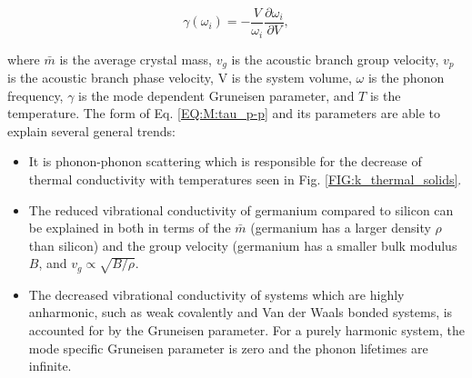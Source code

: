 \documentclass[letterpaper,12pt]{article}
\begin{document}
\begin{equation}\label{EQ:M:tau_p-p}
\gamma(\omega_i) = - \frac{V}{\omega_i}\frac{\partial\omega_i}{\partial V} ,
\end{equation}

where $\bar m$ is the average crystal mass, $v_g$ is the acoustic branch group velocity, $v_p$ is the acoustic branch phase velocity, V is the system volume, $\omega$ is the phonon frequency, $\gamma$ is the mode dependent Gruneisen parameter, and $T$ is the temperature.\cite{callaway1959,holland1963} 
The form of Eq$.$ \eqref{EQ:M:tau_p-p} and its parameters are able to explain several general trends:
\begin{itemize}
\item It is phonon-phonon scattering which is responsible for the decrease of thermal conductivity with temperatures seen in Fig. \ref{FIG:k_thermal_solids}. 
\item The reduced vibrational conductivity of germanium compared to silicon can be explained in both in terms of the $\bar m$ (germanium has a larger density $\rho$ than silicon) and the group velocity (germanium has a smaller bulk modulus $B$, and $v_g \propto \sqrt{B/\rho}$.
\item The decreased vibrational conductivity of systems which are highly anharmonic, such as weak covalently and Van der Waals bonded systems,\cite{costescu2004} is accounted for by the Gruneisen parameter. For a purely harmonic system, the mode specific Gruneisen parameter is zero and the phonon lifetimes are infinite.
\end{itemize}
\end{document}
